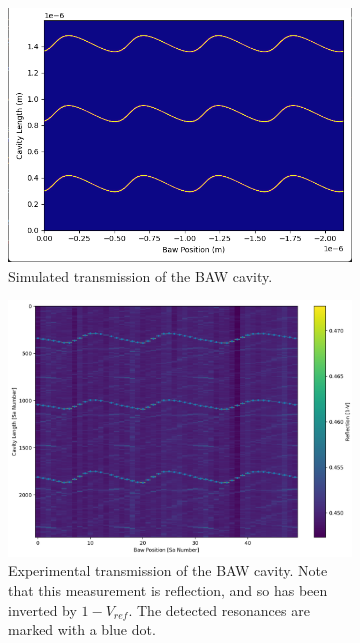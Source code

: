 \documentclass[aps,  
                a4paper, 
                amsmath, 
                amssymb, 
                preprint,
                tightenlines,  
                amsfonts,
                nofootinbib,
                onecolumn,
                titlepage,
                10pt
            ]{revtex4-2}
\begin{document}
    \begin{figure}
        \centering
        \begin{subfigure}[b]{0.65\textwidth}
            \includegraphics[width=\textwidth]{img/simulated-position.png}
            \caption{Simulated transmission of the BAW cavity.}
            \label{fig:sim-transmission-dmim}
        \end{subfigure}
        \begin{subfigure}[b]{0.65\textwidth}
            \includegraphics[width=\textwidth]{img/measured-position.png}
            \caption{Experimental transmission of the BAW cavity. Note that this measurement is reflection, and so has been inverted by $1-V_{ref}$. The detected resonances are marked with a blue dot.}
            \label{fig:exp-transmission-dmim}
        \end{subfigure}
        \caption{}
        \label{fig:transmission-dmim}
    \end{figure}
\end{document}
